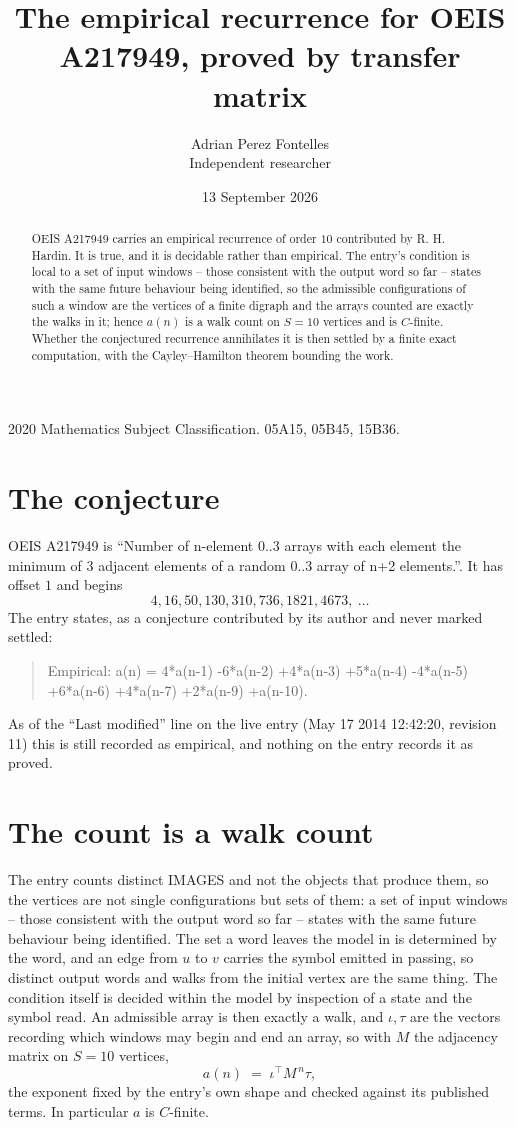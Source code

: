 \documentclass[11pt,a4paper]{article}
\title{The empirical recurrence for OEIS A217949, proved by transfer matrix}
\author{Adrian Perez Fontelles\\ \small Independent researcher}
\date{13 September 2026}
\theoremstyle{plain}
\theoremstyle{definition}
\begin{document}
\maketitle

\begin{abstract}
OEIS A217949 carries an empirical recurrence of order $10$ contributed by R. H. Hardin. It is
true, and it is decidable rather than empirical. The entry's condition is local to a set of input windows -- those consistent with the output word so far -- states with the same future behaviour being identified, so
the admissible configurations of such a window are the vertices of a finite digraph and the
arrays counted are exactly the walks in it; hence $a(n)$ is a walk count on $S=10$ vertices
and is $C$-finite. Whether the conjectured recurrence annihilates it is then settled by a
finite exact computation, with the Cayley--Hamilton theorem bounding the work.
\end{abstract}

\noindent\small 2020 Mathematics Subject Classification. 05A15, 05B45, 15B36.\normalsize

\section{The conjecture}

OEIS A217949 is ``Number of n-element 0..3 arrays with each element the minimum of 3 adjacent elements of a random 0..3 array of n+2 elements.''. It has offset $1$ and begins
\[
4, 16, 50, 130, 310, 736, 1821, 4673,\ \dots
\]
The entry states, as a conjecture contributed by its author and never marked settled:
\begin{quote}
Empirical: a(n) = 4*a(n-1) -6*a(n-2) +4*a(n-3) +5*a(n-4) -4*a(n-5) +6*a(n-6) +4*a(n-7) +2*a(n-9) +a(n-10).
\end{quote}
As of the ``Last modified'' line on the live entry (May 17 2014 12:42:20, revision 11) this is still
recorded as empirical, and nothing on the entry records it as proved.

\section{The count is a walk count}

The entry counts distinct IMAGES and not the objects that produce them, so the vertices are not single configurations but sets of them: a set of input windows -- those consistent with the output word so far -- states with the same future behaviour being identified. The set a word leaves the model in is determined by the word, and an edge from $u$ to $v$ carries the symbol emitted in passing, so distinct output words and walks from the initial vertex are the same thing. The condition itself is decided within the model by inspection of a state and the symbol read.
An admissible array is then exactly a walk, and $\iota,\tau$ are the vectors recording which windows may begin and end an array, so with $M$ the adjacency matrix on $S=10$ vertices,
\[
a(n)\;=\;\iota^{\!\top}M^{\,n}\tau ,
\]
the exponent fixed by the entry's own shape and checked against its published terms. In
particular $a$ is $C$-finite.
\end{document}
